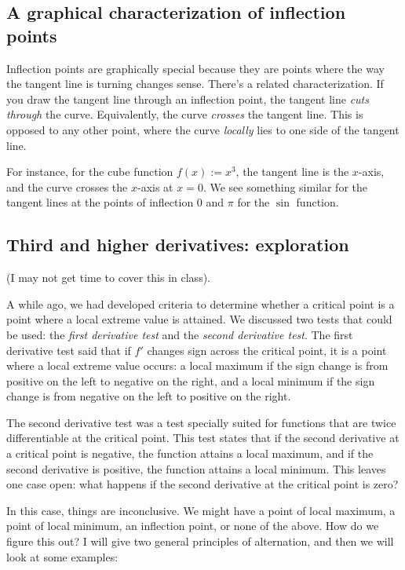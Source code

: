 \documentclass[10pt]{amsart}
\begin{document}
\subsection{A graphical characterization of inflection points}

Inflection points are graphically special because they are points
where the way the tangent line is turning changes sense. There's a
related characterization. If you draw the tangent line through an
inflection point, the tangent line {\em cuts through} the
curve. Equivalently, the curve {\em crosses} the tangent line. This is
opposed to any other point, where the curve {\em locally} lies to one
side of the tangent line.

For instance, for the cube function $f(x) := x^3$, the tangent line is
the $x$-axis, and the curve crosses the $x$-axis at $x = 0$. We see
something similar for the tangent lines at the points of inflection
$0$ and $\pi$ for the $\sin$ function.

\subsection{Third and higher derivatives: exploration}

(I may not get time to cover this in class).

A while ago, we had developed criteria to determine whether a critical
point is a point where a local extreme value is attained. We discussed
two tests that could be used: the {\em first derivative test} and the
{\em second derivative test}. The first derivative test said that if
$f'$ changes sign across the critical point, it is a point where a
local extreme value occurs: a local maximum if the sign change is from
positive on the left to negative on the right, and a local minimum if
the sign change is from negative on the left to positive on the right.

The second derivative test was a test specially suited for functions
that are twice differentiable at the critical point. This test states
that if the second derivative at a critical point is negative, the
function attains a local maximum, and if the second derivative is
positive, the function attains a local minimum. This leaves one case
open: what happens if the second derivative at the critical point is
zero?

In this case, things are inconclusive. We might have a point of local
maximum, a point of local minimum, an inflection point, or none of the
above. How do we figure this out? I will give two general principles
of alternation, and then we will look at some examples:
\end{document}
